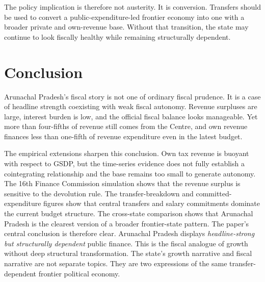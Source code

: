 \documentclass[11pt,a4paper]{article}
\begin{document}
The policy implication is therefore not austerity. It is conversion. Transfers should be used to convert a public-expenditure-led frontier economy into one with a broader private and own-revenue base. Without that transition, the state may continue to look fiscally healthy while remaining structurally dependent.

\section{Conclusion}

Arunachal Pradesh's fiscal story is not one of ordinary fiscal prudence. It is a case of headline strength coexisting with weak fiscal autonomy. Revenue surpluses are large, interest burden is low, and the official fiscal balance looks manageable. Yet more than four-fifths of revenue still comes from the Centre, and own revenue finances less than one-fifth of revenue expenditure even in the latest budget.

The empirical extensions sharpen this conclusion. Own tax revenue is buoyant with respect to GSDP, but the time-series evidence does not fully establish a cointegrating relationship and the base remains too small to generate autonomy. The 16th Finance Commission simulation shows that the revenue surplus is sensitive to the devolution rule. The transfer-breakdown and committed-expenditure figures show that central transfers and salary commitments dominate the current budget structure. The cross-state comparison shows that Arunachal Pradesh is the clearest version of a broader frontier-state pattern. The paper's central conclusion is therefore clear. Arunachal Pradesh displays \emph{headline-strong but structurally dependent} public finance. This is the fiscal analogue of growth without deep structural transformation. The state's growth narrative and fiscal narrative are not separate topics. They are two expressions of the same transfer-dependent frontier political economy.
\end{document}
